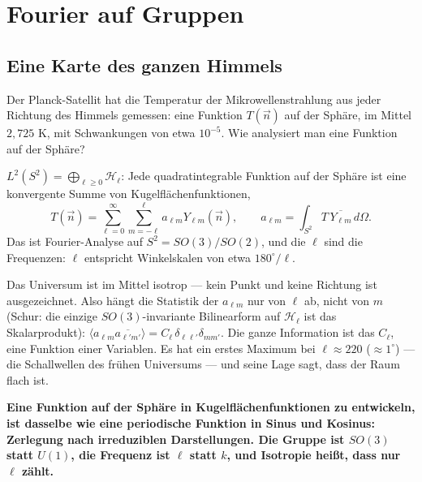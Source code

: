 \chapter{Fourier auf Gruppen}

\section{Eine Karte des ganzen Himmels}

\begin{merksatz}
Der Planck-Satellit hat die Temperatur der Mikrowellenstrahlung aus jeder Richtung des Himmels gemessen: eine Funktion $T(\vec n)$ auf der Sphäre, im Mittel $2{,}725$ K, mit Schwankungen von etwa $10^{-5}$. Wie analysiert man eine Funktion auf der Sphäre?

$L^{2}(S^{2}) = \bigoplus_{\ell\ge0}\mathcal H_\ell$: Jede quadratintegrable Funktion auf der Sphäre ist eine konvergente Summe von Kugelflächenfunktionen,
\[ T(\vec n) = \sum_{\ell = 0}^{\infty}\sum_{m = -\ell}^{\ell}a_{\ell m}Y_{\ell m}(\vec n),\qquad a_{\ell m} = \int_{S^{2}}T\,\overline{Y_{\ell m}}\,d\Omega . \]
Das ist Fourier-Analyse auf $S^{2} = SO(3)/SO(2)$, und die $\ell$ sind die Frequenzen: $\ell$ entspricht Winkelskalen von etwa $180^{\circ}/\ell$.

Das Universum ist im Mittel isotrop --- kein Punkt und keine Richtung ist ausgezeichnet. Also hängt die Statistik der $a_{\ell m}$ nur von $\ell$ ab, nicht von $m$ (Schur: die einzige $SO(3)$-invariante Bilinearform auf $\mathcal H_\ell$ ist das Skalarprodukt): $\langle a_{\ell m}\overline{a_{\ell' m'}}\rangle = C_\ell\,\delta_{\ell\ell'}\delta_{mm'}$. Die ganze Information ist das  $C_\ell$, eine Funktion einer Variablen. Es hat ein erstes Maximum bei $\ell\approx220$ ($\approx1^{\circ}$) --- die Schallwellen des frühen Universums --- und seine Lage sagt, dass der Raum flach ist.

\begin{center}
\begin{minipage}{0.9\textwidth}
\textbf{Eine Funktion auf der Sphäre in Kugelflächenfunktionen zu entwickeln, ist dasselbe wie eine periodische Funktion in Sinus und Kosinus: Zerlegung nach irreduziblen Darstellungen. Die Gruppe ist $SO(3)$ statt $U(1)$, die Frequenz ist $\ell$ statt $k$, und Isotropie heißt, dass nur $\ell$ zählt.}
\end{minipage}
\end{center}


\end{merksatz}
